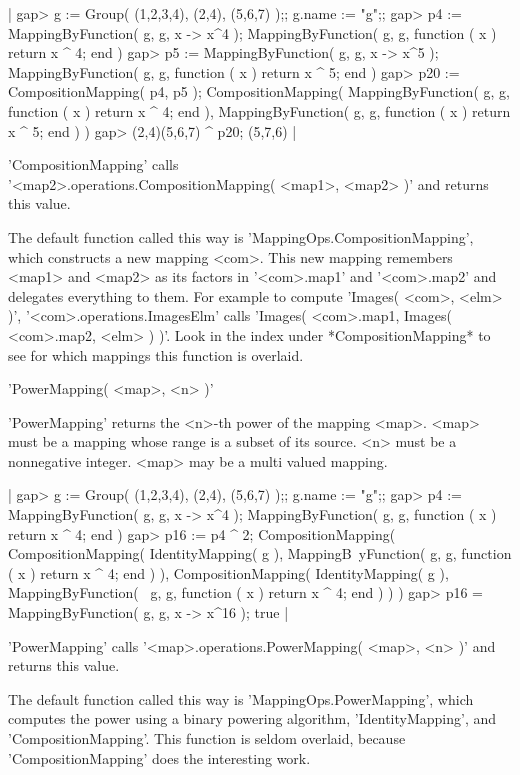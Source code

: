 |    gap> g := Group( (1,2,3,4), (2,4), (5,6,7) );;  g.name := "g";;
    gap> p4 := MappingByFunction( g, g, x -> x^4 );
    MappingByFunction( g, g, function ( x )
        return x ^ 4;
    end )
    gap> p5 := MappingByFunction( g, g, x -> x^5 );
    MappingByFunction( g, g, function ( x )
        return x ^ 5;
    end )
    gap> p20 := CompositionMapping( p4, p5 );
    CompositionMapping( MappingByFunction( g, g, function ( x )
        return x ^ 4;
    end ), MappingByFunction( g, g, function ( x )
        return x ^ 5;
    end ) )
    gap> (2,4)(5,6,7) ^ p20;
    (5,7,6) |

'CompositionMapping' calls \\
'<map2>.operations.CompositionMapping( <map1>, <map2> )'
and returns this value.

The default function called this way is  'MappingOps.CompositionMapping',
which  constructs a new mapping <com>.  This new mapping remembers <map1>
and <map2>  as its factors in '<com>.map1' and '<com>.map2' and delegates
everything  to  them.   For example to compute  'Images( <com>, <elm> )',
'<com>.operations.ImagesElm'   calls    'Images(   <com>.map1,    Images(
<com>.map2, <elm> ) )'.  Look in the index  under *CompositionMapping* to
see for which mappings this function is overlaid.


'PowerMapping( <map>, <n> )'

'PowerMapping' returns the <n>-th power of the mapping <map>.  <map> must
be a  mapping whose  range  is  a subset of its  source.  <n>  must  be a
nonnegative integer.  <map> may be a multi valued mapping.

|    gap> g := Group( (1,2,3,4), (2,4), (5,6,7) );;  g.name := "g";;
    gap> p4 := MappingByFunction( g, g, x -> x^4 );
    MappingByFunction( g, g, function ( x )
        return x ^ 4;
    end )
    gap> p16 := p4 ^ 2;
    CompositionMapping( CompositionMapping( IdentityMapping( g ), MappingB\
    yFunction( g, g, function ( x )
        return x ^ 4;
    end ) ), CompositionMapping( IdentityMapping( g ), MappingByFunction( \
    g, g, function ( x )
        return x ^ 4;
    end ) ) )
    gap> p16 = MappingByFunction( g, g, x -> x^16 );
    true |

'PowerMapping' calls  '<map>.operations.PowerMapping( <map>,  <n>  )' and
returns this value.

The default function called this way  is 'MappingOps.PowerMapping', which
computes the power using a binary powering algorithm,  'IdentityMapping',
and  'CompositionMapping'.  This  function  is  seldom overlaid,  because
'CompositionMapping' does the interesting work.

